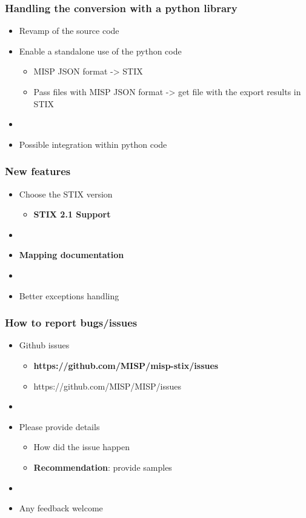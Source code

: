 \begin{frame}
    \frametitle{Handling the conversion with a python library}
    \begin{itemize}
        \item Revamp of the source code
        \item Enable a standalone use of the python code
        \begin{itemize}
            \item MISP JSON  format -> STIX
            \item Pass files with MISP JSON format -> get file with the export results in STIX
        \end{itemize}
        \item []
        \item Possible integration within python code
    \end{itemize}
\end{frame}

\begin{frame}
    \frametitle{New features}
    \begin{itemize}
        \item Choose the STIX version
        \begin{itemize}
            \item {\bf STIX 2.1 Support}
        \end{itemize}
        \item []
        \item {\bf Mapping documentation}
        \item []
        \item Better exceptions handling
    \end{itemize}
\end{frame}

\begin{frame}
    \frametitle{How to report bugs/issues}
    \begin{itemize}
        \item Github issues
        \begin{itemize}
            \item {\bf https://github.com/MISP/misp-stix/issues}
            \item https://github.com/MISP/MISP/issues
        \end{itemize}
        \item []
        \item Please provide details
        \begin{itemize}
            \item How did the issue happen
            \item {\bf Recommendation}: provide samples
        \end{itemize}
        \item[]
        \item Any feedback welcome
    \end{itemize}
\end{frame}

